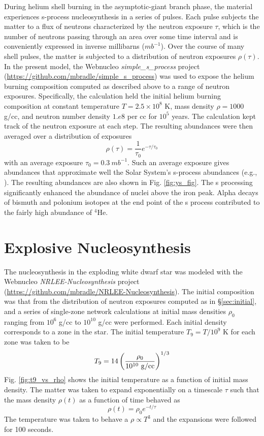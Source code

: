 \documentclass[preprint]{revtex4-2}
\begin{document}
During helium shell burning in the asymptotic-giant branch phase,
the material experiences s-process nucleosynthesis in a series of
pulses.  Each pulse subjects the matter to a flux of neutrons characterized
by the neutron exposure $\tau$, which is the number of neutrons passing
through an area over some time interval and is conveniently expressed in
inverse millibarns ($mb^{-1}$).  Over the course of many shell pulses, the
matter is subjected to a distribution of neutron exposures $\rho(\tau)$.
In the present model, the Webnucleo {\it simple\_s\_process} project
(\url{https://github.com/mbradle/simple_s_process}) was used to expose
the helium burning composition computed as described above to a range of
neutron exposures.  Specifically, the calculation held the initial
helium burning composition at constant temperature $T = 2.5 \times 10^8$ K,
mass density $\rho = 1000$ g/cc, and neutron number density $1.e8$ per cc
for $10^5$ years.  The calculation kept track of the neutron exposure at
each step.  The resulting abundances were then averaged over a distribution
of exposures
\begin{equation}
\rho(\tau) = \frac{1}{\tau_0} e^{-\tau/\tau_0}
\label{eq:rho_exposure}
\end{equation}
with an average exposure $\tau_0 = 0.3\ mb^{-1}$.  Such an average exposure
gives abundances that approximate well the Solar System's s-process
abundances (e.g., \cite{1974ApJ...193..397C}).  The resulting abundances
are also shown in Fig. \ref{fig:ys_fig}.  The s processing significantly
enhanced the abundance of nuclei above the iron peak.  Alpha decays of
bismuth and polonium isotopes at the end point of the s process contributed
to the fairly high abundance of $^4$He.

\section{Explosive Nucleosynthesis} \label{sec:expl}

The nucleosynthesis in the exploding white dwarf star was modeled with
the Webnucleo {\it NRLEE-Nucleosynthesis} project
(\url{https://github.com/mbradle/NRLEE-Nucleosynthesis}).  The initial
composition was that
from the distribution of neutron exposures computed as in \S \ref{sec:initial},
and a series of single-zone network calculations at initial mass densities
$\rho_0$ ranging from $10^6$ g/cc to $10^{10}$ g/cc were performed.
Each initial density
corresponds to a zone in the star.  The initial temperature
$T_9 = T / 10^9$ K
for each zone was taken to be
\begin{equation}
T_9 = 14 \left(\frac{\rho_0}{10^{10}\ \rm{g/cc}}\right)^{1/3}
\label{eq:t9_0}
\end{equation}
Fig. \ref{fig:t9_vs_rho} shows the initial temperature as a function of
initial mass density.  The matter was taken to expand exponentially on
a timescale $\tau$ such that the mass density $\rho(t)$ as a function of
time behaved as
\begin{equation}
\rho(t) = \rho_0 e^{-t / \tau}
\label{eq:rho_t}
\end{equation}
The temperature was taken to behave a $\rho \propto T^3$ and the expansions
were followed for 100 seconds.
\end{document}
